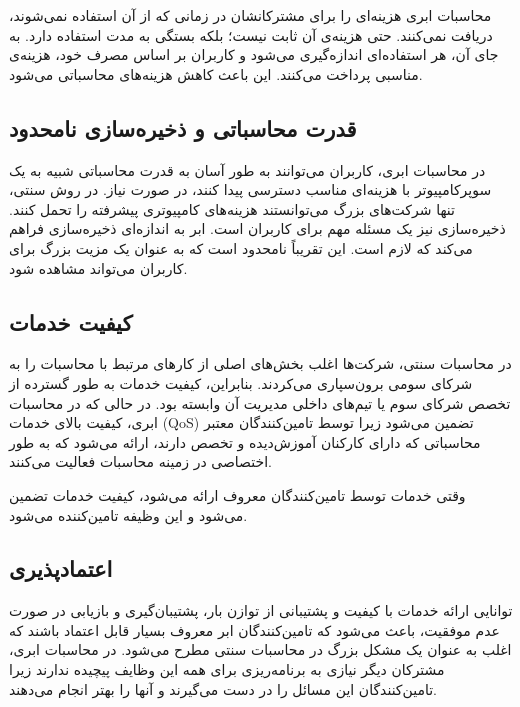 \documentclass{book}
\begin{document}
        محاسبات ابری هزینه‌ای را برای مشترکانشان در زمانی که از آن استفاده نمی‌شوند، دریافت نمی‌کنند. حتی هزینه‌ی آن ثابت نیست؛ بلکه بستگی به مدت استفاده دارد. به جای آن، هر استفاده‌ای اندازه‌گیری می‌شود و کاربران بر اساس مصرف خود، هزینه‌ی مناسبی پرداخت می‌کنند. این باعث کاهش هزینه‌های محاسباتی می‌شود.

    \subsection{قدرت محاسباتی و ذخیره‌سازی نامحدود}

        در محاسبات ابری، کاربران می‌توانند به طور آسان به قدرت محاسباتی شبیه به یک سوپرکامپیوتر با هزینه‌ای مناسب دسترسی پیدا کنند، در صورت نیاز. در روش سنتی، تنها شرکت‌های بزرگ می‌توانستند هزینه‌های کامپیوتری پیشرفته را تحمل کنند. ذخیره‌سازی نیز یک مسئله مهم برای کاربران است. ابر به اندازه‌ای ذخیره‌سازی فراهم می‌کند که لازم است. این تقریباً نامحدود است که به عنوان یک مزیت بزرگ برای کاربران می‌تواند مشاهده شود.

    \subsection{کیفیت خدمات}

        در محاسبات سنتی، شرکت‌ها اغلب بخش‌های اصلی از کارهای مرتبط با محاسبات را به شرکای سومی برون‌سپاری می‌کردند. بنابراین، کیفیت خدمات به طور گسترده از تخصص شرکای سوم یا تیم‌های داخلی مدیریت آن وابسته بود. در حالی که در محاسبات ابری، کیفیت بالای خدمات (QoS) تضمین می‌شود زیرا توسط تامین‌کنندگان معتبر محاسباتی که دارای کارکنان آموزش‌دیده و تخصص دارند، ارائه می‌شود که به طور اختصاصی در زمینه محاسبات فعالیت می‌کنند.
    
    \begin{addinfo}
        
        وقتی خدمات توسط تامین‌کنندگان معروف ارائه می‌شود، کیفیت خدمات تضمین می‌شود و این وظیفه تامین‌کننده می‌شود.

    \end{addinfo}

    \subsection{اعتماد‌پذیری}

        توانایی ارائه خدمات با کیفیت و پشتیبانی از توازن بار، پشتیبان‌گیری و بازیابی در صورت عدم موفقیت، باعث می‌شود که تامین‌کنندگان ابر معروف بسیار قابل اعتماد باشند که اغلب به عنوان یک مشکل بزرگ در محاسبات سنتی مطرح می‌شود. در محاسبات ابری، مشترکان دیگر نیازی به برنامه‌ریزی برای همه این وظایف پیچیده ندارند زیرا تامین‌کنندگان این مسائل را در دست می‌گیرند و آنها را بهتر انجام می‌دهند.
\end{document}
